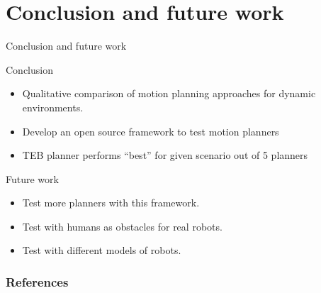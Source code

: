 \documentclass{beamer}
\begin{document}
\section{Conclusion and future work}
\begin{frame}{\huge{Conclusion and future work}}
    \begin{block}{Conclusion}
        \begin{itemize}
            \item Qualitative comparison of motion planning approaches for dynamic
                environments.
            \item Develop an open source framework to test motion planners
            \item TEB planner performs ``best'' for given scenario out of 5 planners
        \end{itemize}
    \end{block}
    \begin{block}{Future work}
        \begin{itemize}
            \item Test more planners with this framework.
            \item Test with humans as obstacles for real robots.
            \item Test with different models of robots.
        \end{itemize}
    \end{block}
\end{frame}

\begin{frame}[allowframebreaks]
    \frametitle{\huge{References}}
    \tiny{ \printbibliography}
\end{frame}
%
\end{document}
